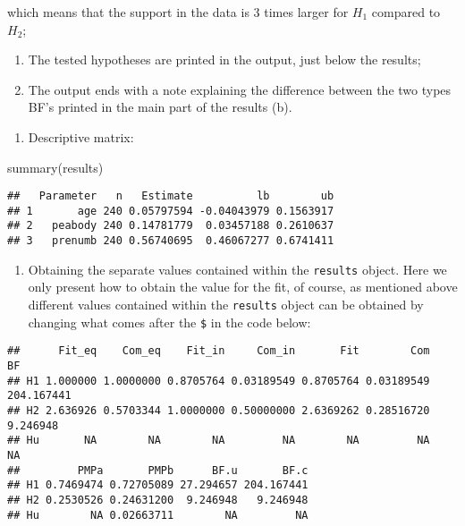 \documentclass[
]{book}
\newenvironment{Shaded}{\begin{snugshade}}{\end{snugshade}}
\newcommand{\FunctionTok}[1]{\textcolor[rgb]{0.00,0.00,0.00}{#1}}
\newcommand{\NormalTok}[1]{#1}
\newcommand{\SpecialCharTok}[1]{\textcolor[rgb]{0.00,0.00,0.00}{#1}}
\providecommand{\tightlist}{%
  \setlength{\itemsep}{0pt}\setlength{\parskip}{0pt}}
\begin{document}
which means that the support in the data is 3 times larger for \(H_1\) compared to \(H_2\);

\begin{enumerate}
\def\labelenumi{(\alph{enumi})}
\setcounter{enumi}{2}
\tightlist
\item
  The tested hypotheses are printed in the output, just below the results;
\item
  The output ends with a note explaining the difference between the two types BF's printed in the main part of the results (b).
\end{enumerate}

\begin{enumerate}
\def\labelenumi{(\arabic{enumi})}
\setcounter{enumi}{1}
\tightlist
\item
  Descriptive matrix:
\end{enumerate}

\begin{Shaded}
\begin{Highlighting}[]
\FunctionTok{summary}\NormalTok{(results)}
\end{Highlighting}
\end{Shaded}

\begin{verbatim}
##   Parameter   n   Estimate          lb        ub
## 1       age 240 0.05797594 -0.04043979 0.1563917
## 2   peabody 240 0.14781779  0.03457188 0.2610637
## 3   prenumb 240 0.56740695  0.46067277 0.6741411
\end{verbatim}

\begin{enumerate}
\def\labelenumi{(\arabic{enumi})}
\setcounter{enumi}{2}
\tightlist
\item
  Obtaining the separate values contained within the \texttt{results} object. Here we only present how to obtain the value for the fit, of course, as mentioned above different values contained within the \texttt{results} object can be obtained by changing what comes after the \texttt{\$} in the code below:
\end{enumerate}

\begin{Shaded}
\end{Shaded}

\begin{verbatim}
##      Fit_eq    Com_eq    Fit_in     Com_in       Fit        Com         BF
## H1 1.000000 1.0000000 0.8705764 0.03189549 0.8705764 0.03189549 204.167441
## H2 2.636926 0.5703344 1.0000000 0.50000000 2.6369262 0.28516720   9.246948
## Hu       NA        NA        NA         NA        NA         NA         NA
##         PMPa       PMPb      BF.u       BF.c
## H1 0.7469474 0.72705089 27.294657 204.167441
## H2 0.2530526 0.24631200  9.246948   9.246948
## Hu        NA 0.02663711        NA         NA
\end{verbatim}
\end{document}
